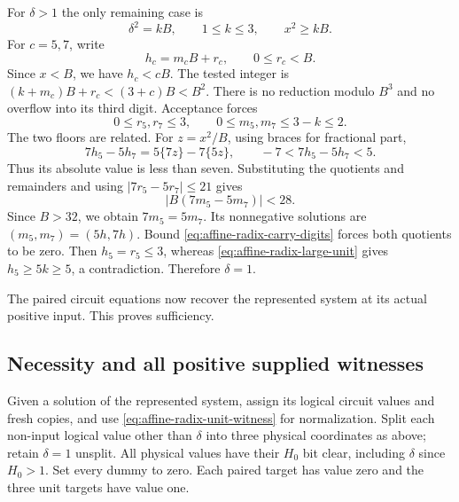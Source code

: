 For $\delta>1$ the only remaining case is
\begin{equation}\label{eq:affine-radix-large-unit}
 \delta^2=kB,\qquad1\le k\le3,\qquad x^2\ge kB.
\end{equation}
For $c=5,7$, write
\[
 h_c=m_cB+r_c,\qquad0\le r_c<B.
\]
Since $x<B$, we have $h_c<cB$. The tested integer is
$(k+m_c)B+r_c<(3+c)B<B^2$. There is no reduction modulo
$B^3$ and no overflow into its third digit. Acceptance forces
\begin{equation}\label{eq:affine-radix-carry-digits}
 0\le r_5,r_7\le3,\qquad
 0\le m_5,m_7\le3-k\le2.
\end{equation}
The two floors are related. For $z=x^2/B$, using braces for
fractional part,
\begin{equation}\label{eq:affine-radix-floor-relation}
 7h_5-5h_7=5\{7z\}-7\{5z\},\qquad
 -7<7h_5-5h_7<5.
\end{equation}
Thus its absolute value is less than seven. Substituting the
quotients and remainders and using $|7r_5-5r_7|\le21$ gives
\[
 |B(7m_5-5m_7)|<28.
\]
Since $B>32$, we obtain $7m_5=5m_7$. Its nonnegative
solutions are $(m_5,m_7)=(5h,7h)$. Bound
\eqref{eq:affine-radix-carry-digits} forces both quotients to
be zero. Then $h_5=r_5\le3$, whereas
\eqref{eq:affine-radix-large-unit} gives $h_5\ge5k\ge5$,
a contradiction. Therefore $\delta=1$.

The paired circuit equations now recover the represented system
at its actual positive input. This proves sufficiency.

\subsection{Necessity and all positive supplied witnesses}

Given a solution of the represented system, assign its logical
circuit values and fresh copies, and use
\eqref{eq:affine-radix-unit-witness} for normalization.
Split each non-input logical value other than $\delta$ into
three physical coordinates as above; retain $\delta=1$
unsplit. All physical values have their $H_0$ bit clear,
including $\delta$ since $H_0>1$. Set every dummy to zero.
Each paired target has value zero and the three unit targets
have value one.

